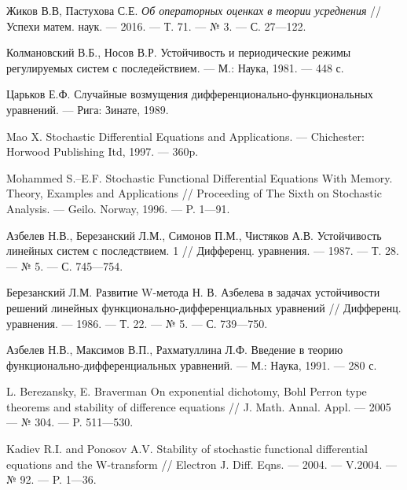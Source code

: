 \begin{thebibliography}{111}
Жиков В.В,  Пастухова С.Е.
 \emph{Об операторных оценках в теории усреднения} //
Успехи матем. наук. --- 2016. --- Т. 71. --- № 3. --- С. 27---122.




	Колмановский В.Б., Носов В.Р. Устойчивость и периодические режимы регулируемых систем с последействием. --- М.: Наука, 1981. --- 448 с.
	
	

	Царьков Е.Ф. Случайные возмущения дифференционально-функциональных уравнений. --- Рига: Зинате, 1989.
	
	

	Mao X. Stochastic Differential Equations and Applications. --- Chichester: Horwood Publishing Itd, 1997. --- 360p.
	
	

	Mohammed S.--E.F. Stochastic Functional Differential Equations With Memory. Theory, Examples and Applications // Proceeding of The Sixth on Stochastic Analysis. --- Geilo. Norway, 1996. --- P. 1---91.
	
	

	Азбелев Н.В., Березанский Л.М., Симонов П.М., Чистяков А.В. Устойчивость линейных систем с последствием. 1 // Дифференц. уравнения. --- 1987. --- Т. 28. --- № 5. --- С. 745---754.
	
	

	Березанский Л.М. Развитие W-метода Н. В. Азбелева в задачах устойчивости решений линейных функционально-дифференциальных уравнений // Дифференц. уравнения. --- 1986. --- Т. 22. --- № 5. --- С. 739---750.
	
	

	Азбелев Н.В., Максимов В.П., Рахматуллина Л.Ф. Введение в теорию функционально-дифференциальных уравнений. --- М.: Наука, 1991. --- 280 с.
	
	

	L. Berezansky, E. Braverman On exponential dichotomy, Bohl Perron type theorems and stability of difference equations // J. Math. Annal. Appl. --- 2005 --- № 304. --- P. 511---530.
	
	

	Kadiev R.I. and Ponosov A.V. Stability of stochastic functional differential equations and the W-transform // Electron J. Diff. Eqns. --- 2004. --- V.2004. --- № 92. --- P. 1---36.
	
	


\end{thebibliography}
